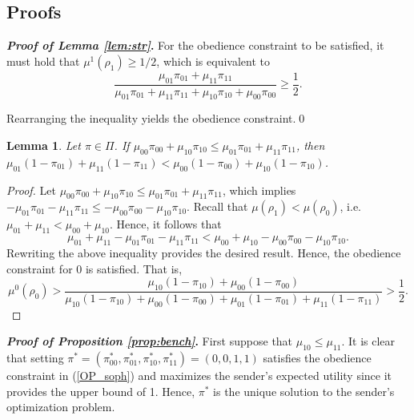 \documentclass[12pt,english]{article}
\newtheorem{lemma}{Lemma}
\theoremstyle{plain}
\begin{document}
\appendixtitleon
\appendixtitletocon
\begin{appendices}

\section{Proofs}
\setcounter{lemma}{0}
    \renewcommand{\thelemma}{\Alph{section}\arabic{lemma}}

\noindent\textbf{\emph{Proof of Lemma \ref{lem:str}}.}
For the obedience constraint to be satisfied, it must hold that $\mu^{1}(\rho_1)\geq 1/2$, which is equivalent to 
\begin{equation*}
\frac{\mu_{01}\pi_{01}+\mu_{11}\pi_{11}}{\mu_{01}\pi_{01}+\mu_{11}\pi_{11}+\mu_{10}\pi_{10}+\mu_{00}\pi_{00}}\geq\frac12.
\end{equation*}

\noindent Rearranging the inequality yields the obedience constraint.\qed

\begin{lemma}\label{lem:suff}
Let $\pi\in\Pi$. 
If $\mu_{00}\pi_{00}+\mu_{10}\pi_{10}\leq \mu_{01}\pi_{01}+\mu_{11}\pi_{11}$, then $\mu_{01}(1-\pi_{01})+\mu_{11}(1-\pi_{11})<\mu_{00}(1-\pi_{00})+\mu_{10}(1-\pi_{10})$.
\end{lemma}
\begin{proof}
Let $\mu_{00}\pi_{00}+\mu_{10}\pi_{10}\leq \mu_{01}\pi_{01}+\mu_{11}\pi_{11}$, which implies $-\mu_{01}\pi_{01}-\mu_{11}\pi_{11}\leq -\mu_{00}\pi_{00}-\mu_{10}\pi_{10}$.
Recall that $\mu(\rho_1)<\mu(\rho_0)$, i.e. $\mu_{01}+\mu_{11}<\mu_{00}+\mu_{10}$.
Hence, it follows that $$\mu_{01}+\mu_{11}-\mu_{01}\pi_{01}-\mu_{11}\pi_{11}<\mu_{00}+\mu_{10}-\mu_{00}\pi_{00}-\mu_{10}\pi_{10}.$$
Rewriting the above inequality provides the desired result. 
Hence, the obedience constraint for $0$ is satisfied.
That is, 
\begin{equation*}
    \mu^{0}(\rho_0)>\frac{\mu_{10}(1-\pi_{10})+\mu_{00}(1-\pi_{00})}{\mu_{10}(1-\pi_{10})+\mu_{00}(1-\pi_{00})+\mu_{01}(1-\pi_{01})+\mu_{11}(1-\pi_{11})}>\frac12.
\end{equation*}
\end{proof}


\noindent\textbf{\emph{Proof of Proposition \ref{prop:bench}}.}
First suppose that $\mu_{10}\leq\mu_{11}$.
It is clear that setting $\pi^*=(\pi^*_{00},\pi^*_{01},\pi^*_{10},\pi^*_{11})=(0,0,1,1)$ satisfies the obedience constraint in (\ref{OP_soph}) and maximizes the sender's expected utility since it provides the upper bound of 1. 
Hence, $\pi^*$ is the unique solution to the sender's optimization problem. 


\end{appendices}
\end{document}
